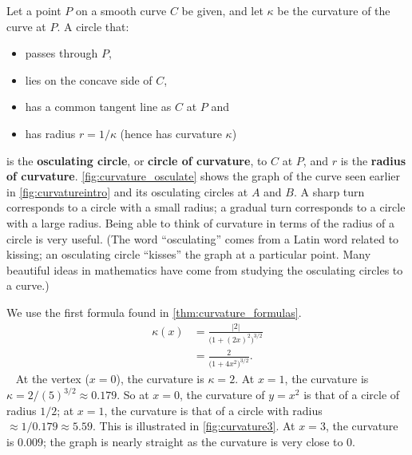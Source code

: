 Let a point $P$ on a smooth curve $C$  be given, and let $\kappa$ be the curvature of the curve at $P$. A circle that:
	\begin{itemize}
		\item passes through $P$,
		\item	lies on the concave side of $C$,
		\item	has a common tangent line as $C$ at $P$ and
		\item	has radius $r=1/\kappa$ (hence has curvature $\kappa$)
	\end{itemize}
is the \textbf{osculating circle}, or \textbf{circle of curvature}, to $C$ at $P$, and $r$ is the \textbf{radius of curvature}. %
\autoref{fig:curvature_osculate} shows the graph of the curve seen earlier in \autoref{fig:curvatureintro} and its osculating circles at $A$ and $B$. A sharp turn corresponds to a circle with a small radius; a gradual turn corresponds to a circle with a large radius. Being able to think of curvature in terms of the radius of a circle is very useful.
 (The word ``osculating'' comes from a Latin word related to kissing; an osculating circle ``kisses'' the graph at a particular point. Many beautiful ideas in mathematics have come from studying the osculating circles to a curve.)

{We use the first formula found in \autoref{thm:curvature_formulas}. 
\begin{align*}
\kappa(x) &= \frac{|2|}{\big(1+(2x)^2\big)^{3/2}} \\
			&= \frac2{\big(1+4x^2\big)^{3/2}}.
\end{align*}\
At the vertex ($x=0$), the curvature is $\kappa = 2$. At $x=1$, the curvature is $\kappa = 2/(5)^{3/2} \approx 0.179.$ So at $x=0$, the curvature of $y=x^2$ is that of a circle of radius $1/2$; at $x=1$, the curvature is that of a circle with radius $\approx 1/0.179 \approx 5.59$. This is illustrated in \autoref{fig:curvature3}. At $x=3$, the curvature is $0.009$; the graph is nearly straight as the curvature is very close to 0.}

